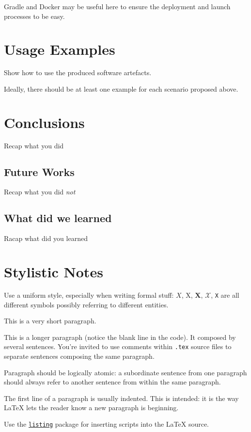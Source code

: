 \documentclass{scrartcl}
\begin{document}
    Gradle and Docker may be useful here to ensure the deployment and launch processes to be easy.


    \section{Usage Examples}

    Show how to use the produced software artefacts.

    Ideally, there should be at least one example for each scenario proposed above.


    \section{Conclusions}

    Recap what you did

    \subsection{Future Works}

    Recap what you did \emph{not}

    \subsection{What did we learned}

    Racap what did you learned

    \section*{Stylistic Notes}

    Use a uniform style, especially when writing formal stuff: $X$, X, $\mathbf{X}$, $\mathcal{X}$, \texttt{X} are all different symbols possibly referring to different entities.

    This is a very short paragraph.

    This is a longer paragraph (notice the blank line in the code).
    It composed by several sentences.
%
    You're invited to use comments within \texttt{.tex} source files to separate sentences composing the same paragraph.

    Paragraph should be logically atomic: a subordinate sentence from one paragraph should always refer to another sentence from within the same paragraph.

    The first line of a paragraph is usually indented.
%
    This is intended: it is the way \LaTeX{} lets the reader know a new paragraph is beginning.

    Use the \href{https://en.wikibooks.org/wiki/LaTeX/Source_Code_Listings}{\texttt{listing}} package for inserting scripts into the \LaTeX{} source.

    \nocite{*} %
    
    
\end{document}
